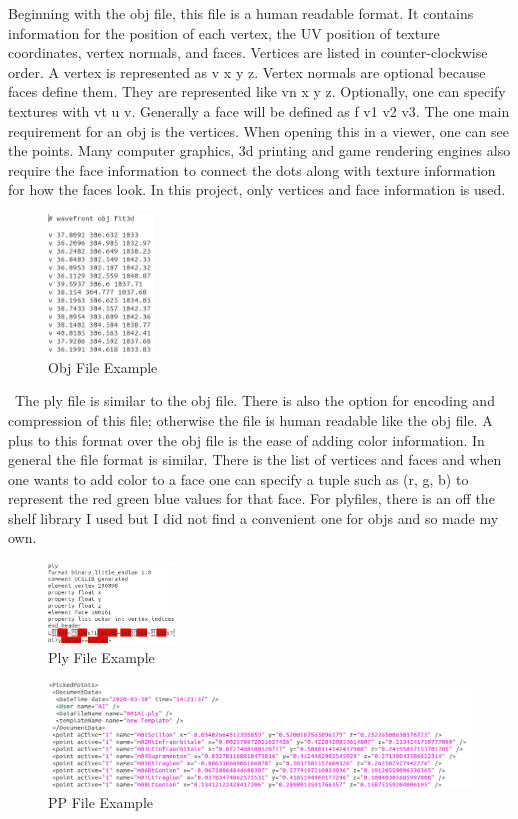 Beginning with the obj file, this file is a human readable format. It contains information for the position of each vertex, the UV position of texture coordinates, vertex normals, and faces. Vertices are listed in counter-clockwise order. A vertex is represented as v x y z. Vertex normals are optional because faces define them. They are represented like vn x y z. Optionally, one can specify textures with vt u v. Generally a face will be defined as f v1 v2 v3. The one main requirement for an obj is the vertices. When opening this in a viewer, one can see the points. Many computer graphics, 3d printing and game rendering engines also require the face information to connect the dots along with texture information for how the faces look. In this project, only vertices and face information is used.
\begin{figure}[!htb]
	\caption{Obj File Example}
	\centering
	\includegraphics[width=0.25\textwidth]{images/obj_file.png}
\end{figure}
\
The ply file is similar to the obj file. There is also the option for encoding and compression of this file; otherwise the file is human readable like the obj file. A plus to this format over the obj file is the ease of adding color information. In general the file format is similar. There is the list of vertices and faces and when one wants to add color to a face one can specify a tuple such as (r, g, b) to represent the red green blue values for that face. For plyfiles, there is an off the shelf library I used but I did not find a convenient one for objs and so made my own. 

\begin{figure}[!htb]
	\caption{Ply File Example}
	\centering
	\includegraphics[width=0.3\textwidth]{images/ply_file.png}
\end{figure}
\begin{figure}[!htb]
	\caption{PP File Example}
	\centering
	\includegraphics[width=1.1\textwidth]{images/pp_file.png}
\end{figure}

